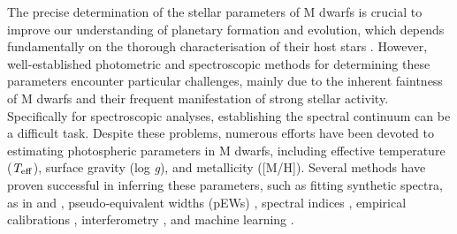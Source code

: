 
The precise determination of the stellar parameters of M dwarfs is crucial to improve our understanding of planetary formation and evolution, which depends fundamentally on the thorough characterisation of their host stars \citep{cifuentes2020}. However, well-established photometric and spectroscopic methods for determining these parameters encounter particular challenges, mainly due to the inherent faintness of M dwarfs and their frequent manifestation of strong stellar activity. Specifically for spectroscopic analyses, establishing the spectral continuum can be a difficult task.
Despite these problems, numerous efforts have been devoted to estimating photospheric parameters in M dwarfs, including effective temperature ($\textit{T}_{\rm eff}$), surface gravity (log \textit{g}), and metallicity ([M/H]). Several methods have proven successful in inferring these parameters, such as fitting synthetic spectra, as in  \citet[][hereafter Pass19]{pass2019} and  \citet[][hereafter Mar21]{mar21}, pseudo-equivalent widths (pEWs) \citep[e.g.][]{Mann2013,Mann2014,Neves2014},
spectral indices \citep[e.g.][]{RojasAyala2010,Rojas2012}, empirical calibrations \citep[e.g.][]{casagrande08,Neves2012}, interferometry \citep[e.g.][]{Boyajian2012,Rabus2019}, and machine learning  \citep[e.g.][hereafter Pass20]{Antoniadis2020,pass20}.

